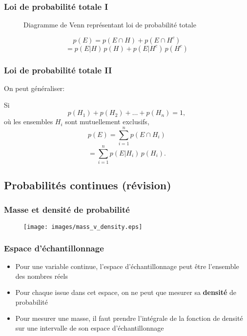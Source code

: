 \documentclass{beamer}
\begin{document}
\begin{frame}
    \frametitle{Loi de probabilité totale I}
    \begin{figure}
      \centering
      
      \caption{Diagramme de Venn représentant loi de probabilité totale}
    \end{figure}
    \pause
    \[p(E) = p(E \cap H) + p(E \cap H^c)\]
    \[ = p(E | H) \, p(H) + p(E | H^c) \, p(H^c)\]
\end{frame}


\begin{frame}
    \frametitle{Loi de probabilité totale II}
    On peut généraliser:

    \pause

    \vfill

    Si 
    \[p(H_1) + p(H_2) + \ldots + p(H_n) = 1,\]
    où les ensembles $H_i$ sont mutuellement exclusifs,
    \pause
    \[p(E) = \sum_{i=1}^{n} p(E \cap H_i)\]
    \pause
    \[= \sum_{i=1}^{n} p(E | H_i) \, p(H_i).\]
\end{frame}



\subsection{Probabilités continues (révision)}

\begin{frame}
    \frametitle{Masse et densité de probabilité}
    \begin{figure}
      \centering
      \texttt{[image: images/mass\_v\_density.eps]}
    \end{figure}
\end{frame}


\begin{frame}
    \frametitle{Espace d'échantillonnage}
    \begin{itemize}
      \item Pour une variable continue, l'espace d'échantillonnage peut être l'ensemble des nombres réels
      \pause
      \item Pour chaque issue dans cet espace, on ne peut que mesurer sa \textbf{densité} de probabilité
      \pause
      \item Pour mesurer une masse, il faut prendre l'intégrale de la fonction
            de densité sur une intervalle de son espace d'échantillonnage
    \end{itemize}
\end{frame}
\end{document}
